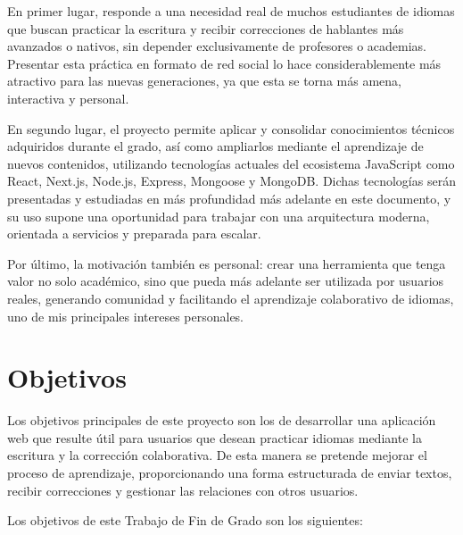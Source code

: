 En primer lugar, responde a una necesidad real de muchos estudiantes de idiomas que buscan practicar la escritura y recibir correcciones de hablantes más avanzados o nativos, sin depender exclusivamente de profesores o academias. Presentar esta práctica en formato de red social lo hace considerablemente más atractivo para las nuevas generaciones, ya que esta se torna más amena, interactiva y personal.

En segundo lugar, el proyecto permite aplicar y consolidar conocimientos técnicos adquiridos durante el grado, así como ampliarlos mediante el aprendizaje de nuevos contenidos, utilizando tecnologías actuales del ecosistema JavaScript como React, Next.js, Node.js, Express, Mongoose y MongoDB. Dichas tecnologías serán presentadas y estudiadas en más profundidad más adelante en este documento, y su uso supone una oportunidad para trabajar con una arquitectura moderna, orientada a servicios y preparada para escalar.

Por último, la motivación también es personal: crear una herramienta que tenga valor no solo académico, sino que pueda más adelante ser utilizada por usuarios reales, generando comunidad y facilitando el aprendizaje colaborativo de idiomas, uno de mis principales intereses personales.

\section{Objetivos}

Los objetivos principales de este proyecto son los de desarrollar una aplicación web que resulte útil para usuarios que desean practicar idiomas mediante la escritura y la corrección colaborativa. De esta manera se pretende mejorar el proceso de aprendizaje, proporcionando una forma estructurada de enviar textos, recibir correcciones y gestionar las relaciones con otros usuarios.

Los objetivos de este Trabajo de Fin de Grado son los siguientes:

